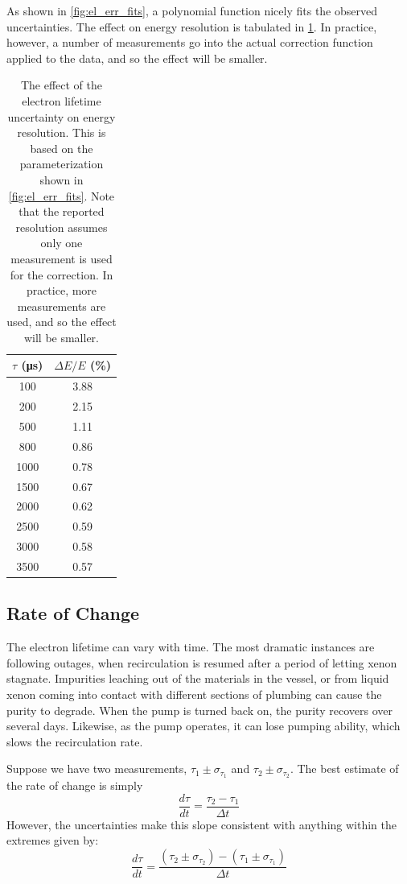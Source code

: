 \documentclass[herrin-thesis.tex]{subfiles}
\begin{document}
As shown in \cref{fig:el_err_fits}, a polynomial function nicely fits the observed uncertainties. The effect on energy resolution is tabulated in \cref{tab:el_res_dtau}. In practice, however, a number of measurements go into the actual correction function applied to the data, and so the effect will be smaller.

\begin{table}[htd]
\centering
\begin{tabular}{c|c}
	\(\tau\) (\si{\micro\second})	&	\(\Delta E / E\) (\%) 	\\ \hline
	100					&	3.88				\\
	200					&	2.15				\\
	500					&	1.11				\\
	800					&	0.86				\\
	1000					&	0.78				\\
	1500					&	0.67				\\
	2000					&	0.62				\\
	2500					&	0.59				\\
	3000					&	0.58				\\
	3500					&	0.57
\end{tabular}
\caption[Electron lifetime uncertainty effect on resolution]{The effect of the electron lifetime uncertainty on energy resolution. This is based on the parameterization shown in \cref{fig:el_err_fits}. Note that the reported resolution assumes only one measurement is used for the correction. In practice, more measurements are used, and so the effect will be smaller.}
\label{tab:el_res_dtau}
\end{table}

\subsection{Rate of Change}
The electron lifetime can vary with time. The most dramatic instances are following outages, when recirculation is resumed after a period of letting xenon stagnate. Impurities leaching out of the materials in the vessel, or from liquid xenon coming into contact with different sections of plumbing can cause the purity to degrade. When the pump is turned back on, the purity recovers over several days. Likewise, as the pump operates, it can lose pumping ability, which slows the recirculation rate.

Suppose we have two measurements, \(\tau_1 \pm \sigma_{\tau_1}\) and \(\tau_2 \pm \sigma_{\tau_2}\). The best estimate of the rate of change is simply
\[\frac{d\tau}{dt} = \frac{\tau_2 - \tau_1}{\Delta t}\]
However, the uncertainties make this slope consistent with anything within the extremes given by:
\[\frac{d\tau}{dt} = \frac{(\tau_2 \pm \sigma_{\tau_2}) - (\tau_1 \pm \sigma_{\tau_1})}{\Delta t}\]
\end{document}
